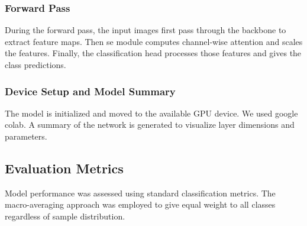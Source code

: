 \documentclass[conference]{IEEEtran}
\begin{document}



\subsubsection{Forward Pass}
During the forward pass, the input images first pass through the backbone to extract feature maps. Then \ac{se} module computes channel-wise attention and scales the features. Finally, the classification head processes those features and gives the class predictions. 




\subsubsection{Device Setup and Model Summary}
The model is initialized and moved to the available GPU device. We used google colab. A summary of the network is generated to visualize layer dimensions and parameters.

\subsection{Evaluation Metrics}
Model performance was assessed using standard classification metrics. The macro-averaging approach was employed to give equal weight to all classes regardless of sample distribution.
\end{document}

